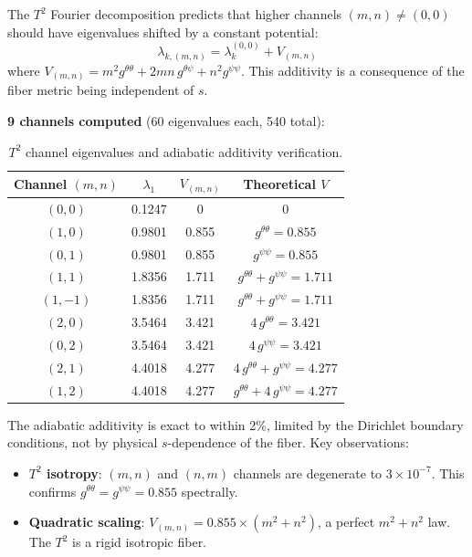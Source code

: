 \documentclass[11pt,a4paper]{article}
\theoremstyle{remark}
\begin{document}
The $T^2$ Fourier decomposition predicts that higher channels $(m, n) \neq (0, 0)$ should
have eigenvalues shifted by a constant potential:
\begin{equation}
\lambda_{k,(m,n)} = \lambda_k^{(0,0)} + V_{(m,n)}
\end{equation}
where $V_{(m,n)} = m^2 g^{\theta\theta} + 2mn\, g^{\theta\psi} + n^2 g^{\psi\psi}$. This additivity is a
consequence of the fiber metric being independent of $s$.

\textbf{9 channels computed} (60 eigenvalues each, 540 total):

\begin{table}[htbp]
\centering
\begin{tabular}{cccc}
\toprule
Channel $(m,n)$ & $\lambda_1$ & $V_{(m,n)}$ & Theoretical $V$ \\
\midrule
$(0,0)$ & 0.1247 & 0 & 0 \\
$(1,0)$ & 0.9801 & 0.855 & $g^{\theta\theta} = 0.855$ \\
$(0,1)$ & 0.9801 & 0.855 & $g^{\psi\psi} = 0.855$ \\
$(1,1)$ & 1.8356 & 1.711 & $g^{\theta\theta} + g^{\psi\psi} = 1.711$ \\
$(1,-1)$ & 1.8356 & 1.711 & $g^{\theta\theta} + g^{\psi\psi} = 1.711$ \\
$(2,0)$ & 3.5464 & 3.421 & $4\, g^{\theta\theta} = 3.421$ \\
$(0,2)$ & 3.5464 & 3.421 & $4\, g^{\psi\psi} = 3.421$ \\
$(2,1)$ & 4.4018 & 4.277 & $4\, g^{\theta\theta} + g^{\psi\psi} = 4.277$ \\
$(1,2)$ & 4.4018 & 4.277 & $g^{\theta\theta} + 4\, g^{\psi\psi} = 4.277$ \\
\bottomrule
\end{tabular}
\caption{$T^2$ channel eigenvalues and adiabatic additivity verification.}
\label{tab:T2_channels}
\end{table}

The adiabatic additivity is exact to within 2\%, limited by the Dirichlet boundary
conditions, not by physical $s$-dependence of the fiber. Key observations:

\begin{itemize}
\item \textbf{$T^2$ isotropy}: $(m, n)$ and $(n, m)$ channels are degenerate to $3 \times 10^{-7}$.
  This confirms $g^{\theta\theta} = g^{\psi\psi} = 0.855$ spectrally.
\item \textbf{Quadratic scaling}: $V_{(m,n)} = 0.855 \times (m^2 + n^2)$, a perfect $m^2 + n^2$ law.
  The $T^2$ is a rigid isotropic fiber.
\end{itemize}
\end{document}
